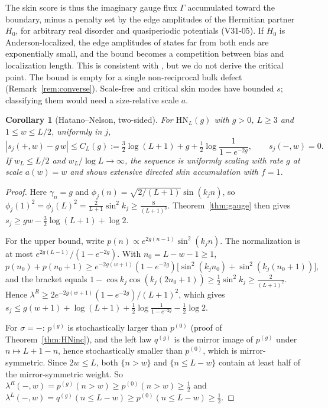 \documentclass[11pt]{article}
\newtheorem{corollary}[theorem]{Corollary}
\theoremstyle{definition}
\theoremstyle{remark}
\begin{document}
The skin score is thus the imaginary gauge flux $\Gamma$ \cite{HN96} accumulated toward the boundary, minus a penalty set by the edge amplitudes of the Hermitian partner $H_0$, for arbitrary real disorder and quasiperiodic potentials (V31-05). If $H_0$ is Anderson-localized, the edge amplitudes of states far from both ends are exponentially small, and the bound becomes a competition between bias and localization length. This is consistent with \cite{HN96,JLYZC19}, but we do not derive the critical point. The bound is empty for a single non-reciprocal bulk defect (Remark~\ref{rem:converse}). Scale-free \cite{LLG21} and critical \cite{LLMG20} skin modes have bounded $s$; classifying them would need a size-relative scale $a$.

\begin{corollary}[Hatano--Nelson, two-sided]\label{cor:HN}
For $\mathrm{HN}_L(g)$ with $g>0$, $L\ge3$ and $1\le w\le L/2$, uniformly in $j$,
\[
|s_j(+,w)-g\,w|\le C_L(g):=\tfrac32\log(L+1)+g+\tfrac12\log\frac{1}{1-e^{-2g}},\qquad s_j(-,w)=0 .
\]
If $w_L\le L/2$ and $w_L/\log L\to\infty$, the sequence is uniformly scaling with rate $g$ at scale $a(w)=w$ and shows extensive directed skin accumulation with $f=1$.
\end{corollary}
\begin{proof}
Here $\gamma_n=g$ and $\phi_j(n)=\sqrt{2/(L+1)}\sin(k_jn)$, so $\phi_j(1)^2=\phi_j(L)^2=\frac{2}{L+1}\sin^2k_j\ge\frac{8}{(L+1)^3}$. Theorem~\ref{thm:gauge} then gives $s_j\ge gw-\frac32\log(L+1)+\log2$.

For the upper bound, write $p(n)\propto e^{2g(n-1)}\sin^2(k_jn)$. The normalization is at most $e^{2g(L-1)}/(1-e^{-2g})$. With $n_0=L-w-1\ge1$,
\[
p(n_0)+p(n_0+1)\ge e^{-2g(w+1)}(1-e^{-2g})\bigl[\sin^2(k_jn_0)+\sin^2(k_j(n_0+1))\bigr],
\]
and the bracket equals $1-\cos k_j\cos(k_j(2n_0+1))\ge\frac12\sin^2k_j\ge\frac2{(L+1)^2}$. Hence $\lambda^R\ge2e^{-2g(w+1)}(1-e^{-2g})/(L+1)^2$, which gives $s_j\le g(w+1)+\log(L+1)+\frac12\log\frac1{1-e^{-2g}}-\frac12\log2$.

For $\sigma=-$: $p^{(g)}$ is stochastically larger than $p^{(0)}$ (proof of Theorem~\ref{thm:HNinc}), and the left law $q^{(g)}$ is the mirror image of $p^{(g)}$ under $n\mapsto L+1-n$, hence stochastically smaller than $p^{(0)}$, which is mirror-symmetric. Since $2w\le L$, both $\{n>w\}$ and $\{n\le L-w\}$ contain at least half of the mirror-symmetric weight. So $\lambda^R(-,w)=p^{(g)}(n>w)\ge p^{(0)}(n>w)\ge\frac12$ and $\lambda^L(-,w)=q^{(g)}(n\le L-w)\ge p^{(0)}(n\le L-w)\ge\frac12$.
\end{proof}
\end{document}
